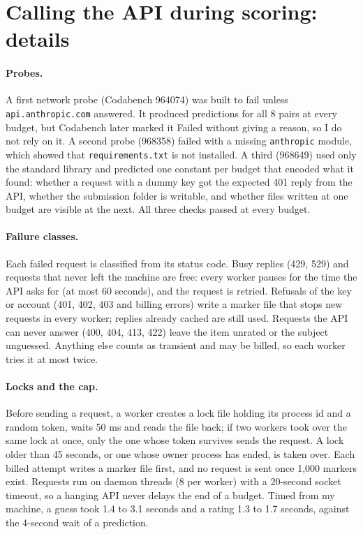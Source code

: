 \section{Calling the API during scoring: details}\label{app:engineering}

\paragraph{Probes.} A first network probe (Codabench 964074) was built to fail unless \texttt{api.anthropic.com} answered. It produced predictions for all 8 pairs at every budget, but Codabench later marked it Failed without giving a reason, so I do not rely on it. A second probe (968358) failed with a missing \texttt{anthropic} module, which showed that \texttt{requirements.txt} is not installed. A third (968649) used only the standard library and predicted one constant per budget that encoded what it found: whether a request with a dummy key got the expected 401 reply from the API, whether the submission folder is writable, and whether files written at one budget are visible at the next. All three checks passed at every budget.

\paragraph{Failure classes.} Each failed request is classified from its status code. Busy replies (429, 529) and requests that never left the machine are free: every worker pauses for the time the API asks for (at most 60 seconds), and the request is retried. Refusals of the key or account (401, 402, 403 and billing errors) write a marker file that stops new requests in every worker; replies already cached are still used. Requests the API can never answer (400, 404, 413, 422) leave the item unrated or the subject unguessed. Anything else counts as transient and may be billed, so each worker tries it at most twice.

\paragraph{Locks and the cap.} Before sending a request, a worker creates a lock file holding its process id and a random token, waits 50 ms and reads the file back; if two workers took over the same lock at once, only the one whose token survives sends the request. A lock older than 45 seconds, or one whose owner process has ended, is taken over. Each billed attempt writes a marker file first, and no request is sent once 1,000 markers exist. Requests run on daemon threads (8 per worker) with a 20-second socket timeout, so a hanging API never delays the end of a budget. Timed from my machine, a guess took 1.4 to 3.1 seconds and a rating 1.3 to 1.7 seconds, against the 4-second wait of a prediction.

